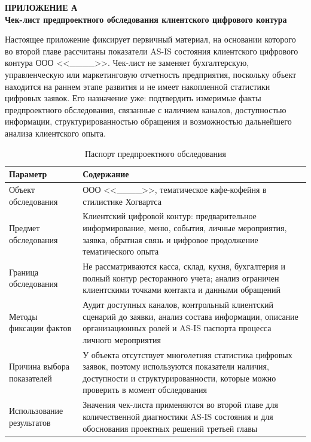 \newpage
\begin{center}
  \textbf{\large ПРИЛОЖЕНИЕ А}\\
  \textbf{\large Чек-лист предпроектного обследования клиентского цифрового контура}
\end{center}
\label{app:ch2_audit}

Настоящее приложение фиксирует первичный материал, на основании которого во второй главе рассчитаны показатели AS-IS состояния клиентского цифрового контура ООО <<\_\_\_\_>>. Чек-лист не заменяет бухгалтерскую, управленческую или маркетинговую отчетность предприятия, поскольку объект находится на раннем этапе развития и не имеет накопленной статистики цифровых заявок. Его назначение уже: подтвердить измеримые факты предпроектного обследования, связанные с наличием каналов, доступностью информации, структурированностью обращения и возможностью дальнейшего анализа клиентского опыта.

\begin{table}[H]
\centering
\small
\caption{Паспорт предпроектного обследования}
\label{tab:app_audit_passport}
\begin{tabularx}{\textwidth}{|>{\raggedright\arraybackslash}p{}|>{\raggedright\arraybackslash}X|}
\hline
\textbf{Параметр} & \textbf{Содержание} \\ \hline
Объект обследования & ООО <<\_\_\_\_>>, тематическое кафе-кофейня в стилистике Хогвартса \\ \hline
Предмет обследования & Клиентский цифровой контур: предварительное информирование, меню, события, личные мероприятия, заявка, обратная связь и цифровое продолжение тематического опыта \\ \hline
Граница обследования & Не рассматриваются касса, склад, кухня, бухгалтерия и полный контур ресторанного учета; анализ ограничен клиентскими точками контакта и данными обращений \\ \hline
Методы фиксации фактов & Аудит доступных каналов, контрольный клиентский сценарий до заявки, анализ состава информации, описание организационных ролей и AS-IS паспорта процесса личного мероприятия \\ \hline
Причина выбора показателей & У объекта отсутствует многолетняя статистика цифровых заявок, поэтому используются показатели наличия, доступности и структурированности, которые можно проверить в момент обследования \\ \hline
Использование результатов & Значения чек-листа применяются во второй главе для количественной диагностики AS-IS состояния и для обоснования проектных решений третьей главы \\ \hline
\end{tabularx}
\normalsize
\end{table}

